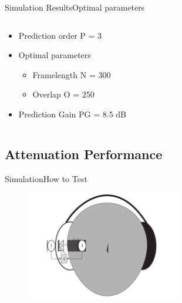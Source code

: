\begin{frame}{Simulation Results}{Optimal parameters}		
\begin{columns}
	\begin{column}{0.4\textwidth}
	\begin{itemize}
		\item Prediction order P = 3
		\item Optimal parameters
		\begin{itemize}
			\item Framelength N = 300
			\item Overlap O = 250
		\end{itemize}
		\item Prediction Gain PG = 8.5 dB
	\end{itemize}
	\end{column}
	\begin{column}{0.6\textwidth} 
		\resizebox{0.9\columnwidth}{!}{		
			}
	\end{column}
\end{columns}
\end{frame}


\subsection{Attenuation Performance}

\begin{frame}{Simulation}{How to Test}	
\begin{figure}[H]
	\centering
	\includegraphics[width=0.6\textwidth]{figures/SystemOverview}
\end{figure}  
\end{frame}

